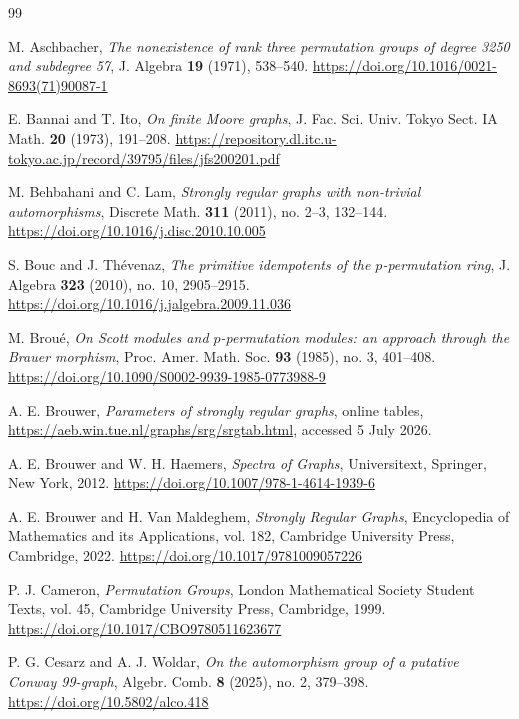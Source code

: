 \documentclass[11pt]{article}
\theoremstyle{plain}
\theoremstyle{remark}
\begin{document}
\begin{thebibliography}{99}

M. Aschbacher,
\emph{The nonexistence of rank three permutation groups of degree 3250 and subdegree 57},
J. Algebra \textbf{19} (1971), 538--540.
\url{https://doi.org/10.1016/0021-8693(71)90087-1}

E. Bannai and T. Ito,
\emph{On finite Moore graphs},
J. Fac. Sci. Univ. Tokyo Sect. IA Math. \textbf{20} (1973), 191--208.
\url{https://repository.dl.itc.u-tokyo.ac.jp/record/39795/files/jfs200201.pdf}

M. Behbahani and C. Lam,
\emph{Strongly regular graphs with non-trivial automorphisms},
Discrete Math. \textbf{311} (2011), no. 2--3, 132--144.
\url{https://doi.org/10.1016/j.disc.2010.10.005}

S. Bouc and J. Th\'evenaz,
\emph{The primitive idempotents of the $p$-permutation ring},
J. Algebra \textbf{323} (2010), no. 10, 2905--2915.
\url{https://doi.org/10.1016/j.jalgebra.2009.11.036}

M. Brou\'e,
\emph{On Scott modules and $p$-permutation modules: an approach through the Brauer morphism},
Proc. Amer. Math. Soc. \textbf{93} (1985), no. 3, 401--408.
\url{https://doi.org/10.1090/S0002-9939-1985-0773988-9}

A. E. Brouwer,
\emph{Parameters of strongly regular graphs},
online tables, \url{https://aeb.win.tue.nl/graphs/srg/srgtab.html},
accessed 5 July 2026.

A. E. Brouwer and W. H. Haemers,
\emph{Spectra of Graphs},
Universitext, Springer, New York, 2012.
\url{https://doi.org/10.1007/978-1-4614-1939-6}

A. E. Brouwer and H. Van Maldeghem,
\emph{Strongly Regular Graphs},
Encyclopedia of Mathematics and its Applications, vol. 182,
Cambridge University Press, Cambridge, 2022.
\url{https://doi.org/10.1017/9781009057226}

P. J. Cameron,
\emph{Permutation Groups},
London Mathematical Society Student Texts, vol. 45,
Cambridge University Press, Cambridge, 1999.
\url{https://doi.org/10.1017/CBO9780511623677}

P. G. Cesarz and A. J. Woldar,
\emph{On the automorphism group of a putative Conway 99-graph},
Algebr. Comb. \textbf{8} (2025), no. 2, 379--398.
\url{https://doi.org/10.5802/alco.418}


\end{thebibliography}
\end{document}
